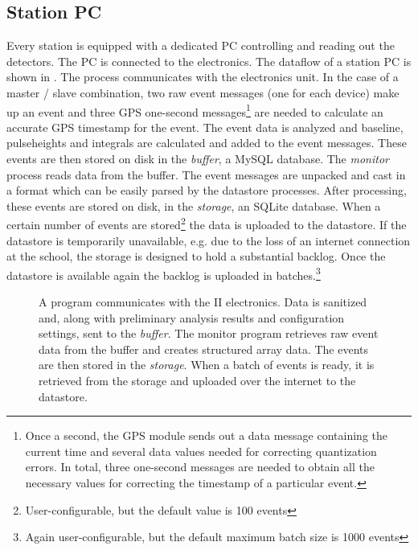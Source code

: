 \subsection{Station PC}

Every \hisparc station is equipped with a dedicated PC controlling and
reading out the detectors.  The PC is connected to the \hisparc
electronics.  The dataflow of a station PC is shown in
.  The \daq process communicates with the
electronics unit. In the case of a master / slave combination, two raw
event messages (one for each device) make up an event and three GPS
one-second messages\footnote{Once a second, the GPS module sends out a
data message containing the current time and several data values needed
for correcting quantization errors.  In total, three one-second messages
are needed to obtain all the necessary values for correcting the
timestamp of a particular event.} are needed to calculate an accurate GPS
timestamp for the event.  The event data is analyzed and baseline,
pulseheights and integrals are calculated and added to the event messages.
These events are then stored on disk in the \emph{buffer}, a MySQL
database. The \emph{monitor} process reads data from the buffer.  The
event messages are unpacked and cast in a format which can be easily
parsed by the datastore processes.  After processing, these events are
stored on disk, in the \emph{storage}, an SQLite database.  When a certain
number of events are stored\footnote{User-configurable, but the default
value is 100 events} the data is uploaded to the datastore.  If the
datastore is temporarily unavailable, e.g.  due to the loss of an internet
connection at the school, the storage is designed to hold a substantial
backlog. Once the datastore is available again the backlog is uploaded in
batches.\footnote{Again user-configurable, but the default maximum batch
size is 1000 events}

\begin{figure}
\centering

\caption{  A \labview
program communicates with the \hisparc II electronics.  Data is
sanitized and, along with preliminary analysis results and configuration
settings, sent to the \emph{buffer}.  The monitor program retrieves raw event
data from the buffer and creates structured array data.  The events are then stored in
the \emph{storage}.  When a batch of events is ready, it is retrieved from
the storage and uploaded over the internet to the datastore.}
\label{fig:dfd-stationpc}
\end{figure}



